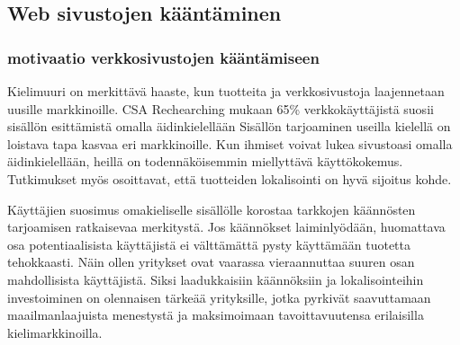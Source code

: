 \documentclass[11pt,a4paper,titlepage,oneside]{article}
\begin{document}
\newpage
\subsection{Web sivustojen kääntäminen}






\subsubsection{motivaatio verkkosivustojen kääntämiseen}










Kielimuuri on merkittävä haaste, kun tuotteita ja verkkosivustoja laajennetaan uusille markkinoille.
CSA Rechearching mukaan 65\% verkkokäyttäjistä suosii sisällön esittämistä omalla äidinkielellään 
Sisällön tarjoaminen useilla kielellä on loistava tapa kasvaa eri markkinoille. 
Kun ihmiset voivat lukea sivustoasi omalla äidinkielellään, heillä on todennäköisemmin miellyttävä käyttökokemus.
Tutkimukset myös osoittavat, että tuotteiden lokalisointi on hyvä sijoitus kohde.
\medskip



Käyttäjien suosimus omakieliselle sisällölle korostaa tarkkojen käännösten tarjoamisen ratkaisevaa merkitystä.
Jos käännökset laiminlyödään, huomattava osa potentiaalisista käyttäjistä ei välttämättä pysty käyttämään tuotetta tehokkaasti.
Näin ollen yritykset ovat vaarassa vieraannuttaa suuren osan mahdollisista käyttäjistä.
% 
Siksi laadukkaisiin käännöksiin ja lokalisointeihin investoiminen on olennaisen tärkeää yrityksille,
jotka pyrkivät saavuttamaan maailmanlaajuista menestystä ja maksimoimaan tavoittavuutensa erilaisilla kielimarkkinoilla.
\medskip %
\end{document}
